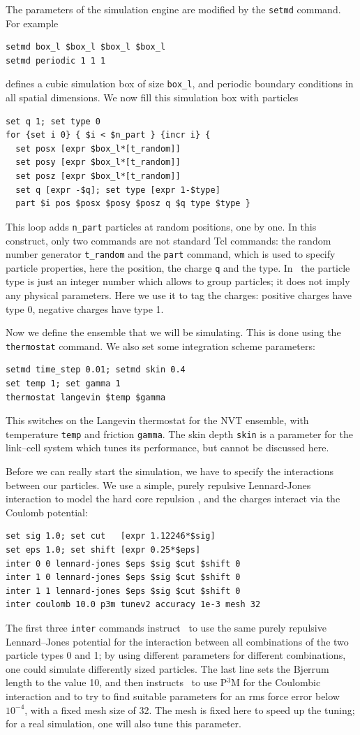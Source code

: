 The parameters of the simulation engine are modified by the \verb|setmd|
command. For example
\begin{verbatim}
setmd box_l $box_l $box_l $box_l
setmd periodic 1 1 1
\end{verbatim}
defines a cubic simulation box of size \verb|box_l|, and periodic boundary
conditions in all spatial dimensions. We now fill this simulation box with
particles
\begin{verbatim}
set q 1; set type 0
for {set i 0} { $i < $n_part } {incr i} {
  set posx [expr $box_l*[t_random]]
  set posy [expr $box_l*[t_random]]
  set posz [expr $box_l*[t_random]]
  set q [expr -$q]; set type [expr 1-$type]
  part $i pos $posx $posy $posz q $q type $type }
\end{verbatim}
This loop adds \verb|n_part| particles at random positions, one by one.  In this
construct, only two commands are not standard Tcl commands: the random
number generator \verb|t_random| and the \verb|part| command, which is used to
specify particle properties, here the position, the charge \verb|q| and the
type. In \es\ the particle type is just an integer number which allows to group
particles; it does not imply any physical parameters. Here we use it to tag the
charges: positive charges have type 0, negative charges have type 1.

Now we define the ensemble that we will be simulating. This is done using the
\verb|thermostat| command. We also set some integration scheme parameters:
\begin{verbatim}
setmd time_step 0.01; setmd skin 0.4
set temp 1; set gamma 1
thermostat langevin $temp $gamma
\end{verbatim}
This switches on the Langevin thermostat for the NVT ensemble, with temperature
\verb|temp| and friction \verb|gamma|. The skin depth \verb|skin| is a parameter
for the link--cell system which tunes its performance, but cannot be discussed
here.

Before we can really start the simulation, we have to specify the interactions
between our particles.  We use a simple, purely repulsive Lennard-Jones
interaction to model the hard core repulsion \cite{grest86a}, and the charges interact via the
Coulomb potential:
\begin{verbatim}
set sig 1.0; set cut   [expr 1.12246*$sig]
set eps 1.0; set shift [expr 0.25*$eps]
inter 0 0 lennard-jones $eps $sig $cut $shift 0
inter 1 0 lennard-jones $eps $sig $cut $shift 0
inter 1 1 lennard-jones $eps $sig $cut $shift 0
inter coulomb 10.0 p3m tunev2 accuracy 1e-3 mesh 32
\end{verbatim}
The first three \verb|inter| commands instruct \es\ to use the same purely
repulsive Lennard--Jones potential for the interaction between all combinations
of the two particle types 0 and 1; by using different parameters for different
combinations, one could simulate differently sized particles.  The last line sets
the Bjerrum length to the value 10, and then
instructs \es\ to use P$^3$M for the Coulombic interaction and to try to find
suitable parameters for an rms force error below $10^{-4}$, with a fixed mesh
size of 32. The mesh is fixed here to speed up the tuning; for a real
simulation, one will also tune this parameter.

